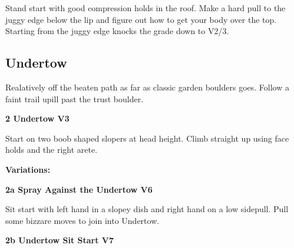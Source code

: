 \begin{multicols}{2}
\begin{minipage}{\linewidth}
					\begin{adjustwidth}{0.5cm}{}				
					Stand start with good compression holds in the roof. Make a hard pull to the juggy edge below the lip and figure out how to get your body over the top. Starting from the juggy edge knocks the grade down to V2/3.
					\end{adjustwidth}
					\end{minipage}
			\subsection*{Undertow}\label{bf:Undertow}
			\begin{minipage}{\columnwidth}
			Realatively off the beaten path as far as classic garden boulders goes. Follow a faint trail upill past the trust boulder.
			\end{minipage}
			
\label{pt:Riptide}

					\begin{minipage}{\linewidth}	
					\label{rt:Undertow}
\colorbox{green!20}{
\parbox{0.95\textwidth}{
\textbf{
2 Undertow V3     
}
}
}

					\begin{adjustwidth}{0.5cm}{}				
					Start on two boob shaped slopers at head height. Climb straight up using face holds and the right arete.
					\end{adjustwidth}
					\end{minipage}
						\begin{adjustwidth}{0.5cm}{}				
						\textbf{Variations:} \newline
							\begin{minipage}{\linewidth}	
							\label{vr:Spray Against the Undertow}
\colorbox{RoyalBlue!20}{
\parbox{0.95\textwidth}{
\textbf{
2a Spray Against the Undertow V6  
}
}
}

							\begin{adjustwidth}{0.5cm}{}				
							Sit start with left hand in a slopey dish and right hand on a low sidepull. Pull some bizzare moves to join into Undertow.
							\end{adjustwidth}
							\end{minipage}
							\begin{minipage}{\linewidth}	
							\label{vr:Undertow Sit Start}
\colorbox{Goldenrod!50}{
\parbox{0.95\textwidth}{
\textbf{
2b Undertow Sit Start V7     
}
}
}


\end{minipage}
\end{adjustwidth}
\end{multicols}
